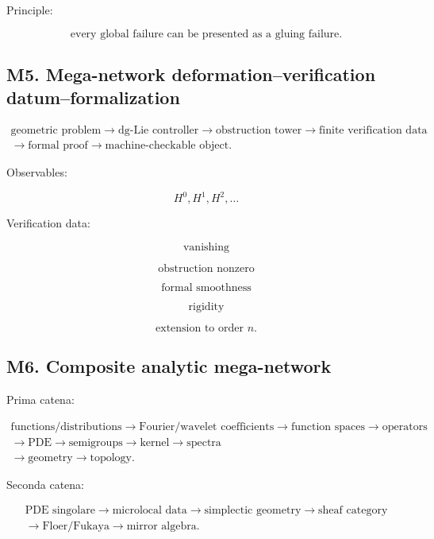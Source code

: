 \documentclass[11pt]{article}
\begin{document}
Principle:

\[
\boxed{
\text{every global failure can be presented as a gluing failure.}
}
\]



\subsection{M5. Mega-network deformation--verification datum--formalization}

\[
\begin{gathered}
\text{geometric problem} \to \text{dg-Lie controller} \to \text{obstruction tower} \to \text{finite verification data} \\
\to \text{formal proof} \to \text{machine-checkable object}.
\end{gathered}
\]

Observables:

\[
H^0,H^1,H^2,\ldots
\]

Verification data:

\[
\text{vanishing}
\]

\[
\text{obstruction nonzero}
\]

\[
\text{formal smoothness}
\]

\[
\text{rigidity}
\]

\[
\text{extension to order }n.
\]



\subsection{M6. Composite analytic mega-network}

Prima catena:

\[
\begin{gathered}
\text{functions/distributions} \to \text{Fourier/wavelet coefficients} \to \text{function spaces} \to \text{operators} \\
\to \text{PDE} \to \text{semigroups} \to \text{kernel} \to \text{spectra} \\
\to \text{geometry} \to \text{topology}.
\end{gathered}
\]

Seconda catena:

\[
\begin{gathered}
\text{PDE singolare} \to \text{microlocal data} \to \text{simplectic geometry} \to \text{sheaf category} \\
\to \text{Floer/Fukaya} \to \text{mirror algebra}.
\end{gathered}
\]
\end{document}
